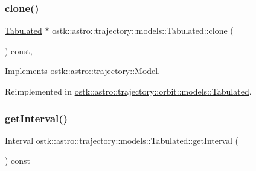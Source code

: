 \mbox{\label{classostk_1_1astro_1_1trajectory_1_1models_1_1_tabulated_a553d2c4027ce269c1c2b3f4e9c65e14d}} 
\subsubsection{\texorpdfstring{clone()}{clone()}}
{\footnotesize\ttfamily \hyperlink{classostk_1_1astro_1_1trajectory_1_1models_1_1_tabulated}{Tabulated} $\ast$ ostk\+::astro\+::trajectory\+::models\+::\+Tabulated\+::clone (\begin{DoxyParamCaption}{ }\end{DoxyParamCaption}) const\hspace{0.3cm}{\ttfamily [override]}, {\ttfamily [virtual]}}



Implements \hyperlink{classostk_1_1astro_1_1trajectory_1_1_model_ad9f1467f711b07796ddc1437fb9ad9df}{ostk\+::astro\+::trajectory\+::\+Model}.



Reimplemented in \hyperlink{classostk_1_1astro_1_1trajectory_1_1orbit_1_1models_1_1_tabulated_a53603727c33f9ff8db520831cf666142}{ostk\+::astro\+::trajectory\+::orbit\+::models\+::\+Tabulated}.

\mbox{\label{classostk_1_1astro_1_1trajectory_1_1models_1_1_tabulated_ad385f1f0126aa00fbc33c120debff086}} 
\subsubsection{\texorpdfstring{get\+Interval()}{getInterval()}}
{\footnotesize\ttfamily Interval ostk\+::astro\+::trajectory\+::models\+::\+Tabulated\+::get\+Interval (\begin{DoxyParamCaption}{ }\end{DoxyParamCaption}) const}


